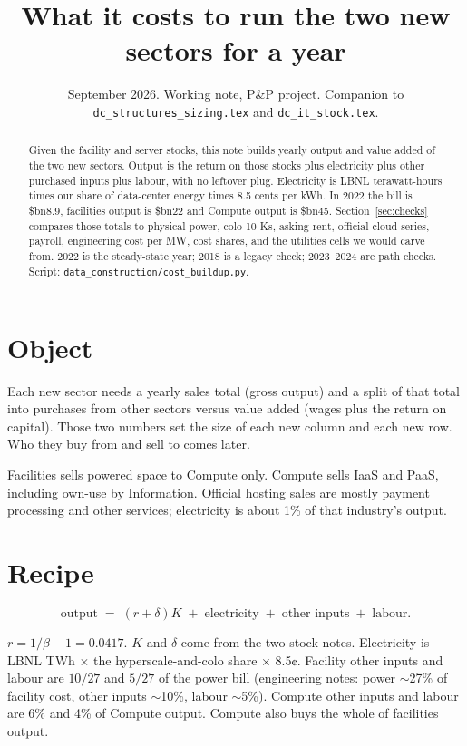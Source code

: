 \documentclass[11pt]{article}
\title{What it costs to run the two new sectors for a year}
\author{}
\date{September 2026. Working note, P\&P project. Companion to \texttt{dc\_structures\_sizing.tex} and \texttt{dc\_it\_stock.tex}.}
\newcommand{\bn}{\$bn}
\begin{document}
\maketitle

\begin{abstract}
\noindent Given the facility and server stocks, this note builds yearly output and value added of the two new sectors. Output is the return on those stocks plus electricity plus other purchased inputs plus labour, with no leftover plug. Electricity is LBNL terawatt-hours times our share of data-center energy times 8.5 cents per kWh. In 2022 the bill is \bn8.9, facilities output is \bn22 and Compute output is \bn45. Section~\ref{sec:checks} compares those totals to physical power, colo 10-Ks, asking rent, official cloud series, payroll, engineering cost per MW, cost shares, and the utilities cells we would carve from. 2022 is the steady-state year; 2018 is a legacy check; 2023--2024 are path checks. Script: \texttt{data\_construction/cost\_buildup.py}.
\end{abstract}

\section{Object}

Each new sector needs a yearly sales total (gross output) and a split of that total into purchases from other sectors versus value added (wages plus the return on capital). Those two numbers set the size of each new column and each new row. Who they buy from and sell to comes later.

Facilities sells powered space to Compute only. Compute sells IaaS and PaaS, including own-use by Information. Official hosting sales are mostly payment processing and other services; electricity is about 1\% of that industry's output.

\section{Recipe}

\begin{equation*}
\text{output} \;=\; (r+\delta)K \;+\; \text{electricity} \;+\; \text{other inputs} \;+\; \text{labour}.
\end{equation*}

$r=1/\beta-1=0.0417$. $K$ and $\delta$ come from the two stock notes. Electricity is LBNL TWh $\times$ the hyperscale-and-colo share $\times$ 8.5¢. Facility other inputs and labour are $10/27$ and $5/27$ of the power bill (engineering notes: power $\sim$27\% of facility cost, other inputs $\sim$10\%, labour $\sim$5\%). Compute other inputs and labour are 6\% and 4\% of Compute output. Compute also buys the whole of facilities output.
\end{document}
